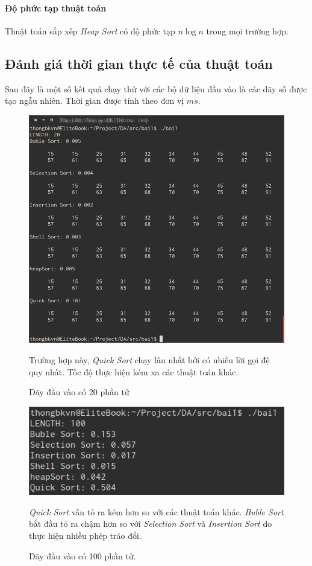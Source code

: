 \documentclass[a4paper,12pt]{report}
\begin{document}
\paragraph{Độ phức tạp thuật toán}
Thuật toán sắp xếp \emph{Heap Sort} có độ phức tạp $n \log n $ trong mọi trường hợp.


\subsection{Đánh giá thời gian thực tế của thuật toán}Sau đây là một số kết quả chạy thử với các bộ dữ liệu đầu vào là các dãy sỗ được tạo ngẫu nhiên. Thời gian được tính theo đơn vị $ms$. 

\begin{figure}[htp]
\begin{center}
\includegraphics[scale=0.50]{img/bai1_20.png}
\caption{Dãy đầu vào có 20 phần tử}
\label{}
\end{center}
Trường hợp này, \emph{Quick Sort} chạy lâu nhất bởi có nhiều lời gọi đệ quy nhất. Tốc độ thực hiện kém xa các thuật toán khác.
\end{figure}

\begin{figure}[htp]
\begin{center}
\includegraphics[scale=0.5]{img/bai1_100.png}
\caption{Dãy đầu vào có 100 phần tử.}
\label{}
\end{center}
\emph{Quick Sort} vẫn tỏ ra kém hơn so với các thuật toán khác. \emph{Buble Sort} bắt đầu tỏ ra chậm hơn so với \emph{Selection Sort} và \emph{Insertion Sort} do thực hiện nhiều phép tráo đổi.
\end{figure}
\end{document}
